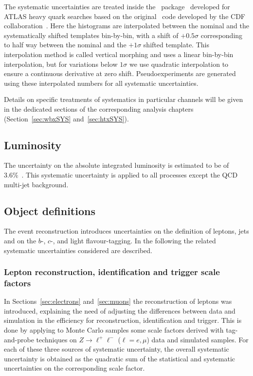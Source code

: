 The systematic uncertainties are treated inside the \mclimit\ 
package~\cite{mclimitATLAS} developed for ATLAS heavy quark
searches based on the original \mclimit\ code developed
by the CDF collaboration~\cite{Heinrich:7587,Junk:8128,Junk:7904}.
Here the  histograms are interpolated between the nominal and the 
systematically shifted templates bin-by-bin, with a shift of $+0.5\sigma$
corresponding to half way between the nominal and the $+1\sigma$ shifted template.
This interpolation method is called vertical morphing and uses a linear 
bin-by-bin interpolation, but for variations below $1\sigma$ we use
quadratic interpolation to ensure a continuous derivative at zero shift.
Pseudoexperiments are generated using these interpolated numbers for
all systematic uncertainties.

Details on specific treatments of systematics in particular channels will
be given in the dedicated sections of the corresponding analysis chapters 
(Section~\ref{sec:wbxSYS} and~\ref{sec:htxSYS}).



\subsection{Luminosity}
\label{sec:syst_lumi}
The uncertainty on the absolute integrated luminosity is estimated to be
of 3.6\%~\cite{lumi}. This systematic uncertainty
is applied to all processes except the QCD multi-jet background.

\subsection{Object definitions}
\label{sec:syst_objects}
The event reconstruction introduces uncertainties on the definition of
leptons, jets and on the $b$-, $c$-, and light flavour-tagging. In the
following the related systematic uncertainties considered are described.

\subsubsection{Lepton reconstruction, identification and trigger scale factors}
\label{sec:syst_lepID}

In Sections~\ref{sec:electrons} and~\ref{sec:muons} the reconstruction
of leptons was introduced, explaining the need of adjusting the
differences between data and simulation in the efficiency for
reconstruction, identification and trigger. This is done by
applying to Monte Carlo samples some scale factors derived 
with tag-and-probe techniques 
on $Z\to \ell^+\ell^-$ ($\ell=e,\mu$) data and simulated samples.
For each of these three sources of systematic uncertainty, 
the overall systematic uncertainty is obtained 
as the quadratic sum of the statistical
and systematic uncertainties on the corresponding scale factor.


